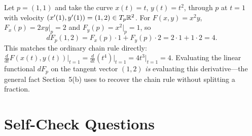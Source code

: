 \documentclass{essay}
\begin{document}
\begin{example}
  Let \(p=(1,1)\) and take the curve \(x(t)=t\), \(y(t)=t^{2}\), through \(p\) at \(t=1\) with velocity \((x'(1),y'(1)) = (1,2) \in T_{p}\mathbb{R}^{2}\). For \(F(x,y)=x^{2}y\), \(F_{x}(p) = 2xy|_{p} = 2\) and \(F_{y}(p) = x^{2}|_{p}=1\), so
  \[ dF_{p}(1,2) = F_{x}(p)\cdot 1 + F_{y}(p)\cdot 2 = 2\cdot1+1\cdot2 = 4. \]
  This matches the ordinary chain rule directly: \(\frac{d}{dt}F(x(t),y(t))\big|_{t=1} = \frac{d}{dt}(t^{4})\big|_{t=1} = 4t^{3}\big|_{t=1}=4\). Evaluating the linear functional \(dF_{p}\) on the tangent vector \((1,2)\) \emph{is} evaluating this derivative---the general fact Section~5(b) uses to recover the chain rule without splitting a fraction.
\end{example}

\section*{Self-Check Questions}
\end{document}

